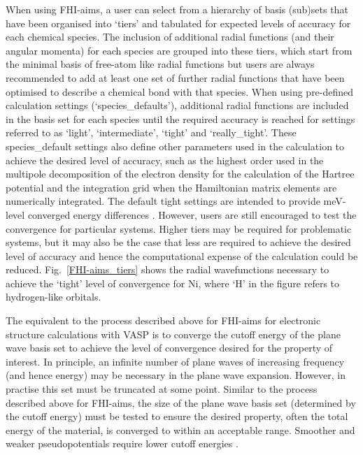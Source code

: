 \documentclass[11pt, twoside]{report}
\begin{document}
When using FHI-aims, a user can select from a hierarchy of basis (sub)sets that have been organised into `tiers' and tabulated for expected levels of accuracy for each chemical species. The inclusion of additional radial functions (and their angular momenta) for each species are grouped into these tiers, which start from the minimal basis of free-atom like radial functions but users are always recommended to add at least one set of further radial functions that have been optimised to describe a chemical bond with that species.  When using pre-defined calculation settings (`species\_defaults'), additional radial functions are included in the basis set for each species until the required accuracy is reached for settings referred to as `light', `intermediate', `tight' and `really\_tight'. These species\_default settings also define other parameters used in the calculation to achieve the desired level of accuracy, such as the highest order used in the multipole decomposition of the electron density for the calculation of the Hartree potential and the integration grid when the Hamiltonian matrix elements are numerically integrated. The default tight settings are intended to provide meV-level converged energy differences \cite{FHI-aims_manual}. However, users are still encouraged to test the convergence for particular systems. Higher tiers may be required for problematic systems, but it may also be the case that less are required to achieve the desired level of accuracy and hence the computational expense of the calculation could be reduced. Fig.~\ref{FHI-aims_tiers} shows the radial wavefunctions necessary to achieve the `tight' level of convergence for Ni, where `H' in the figure refers to hydrogen-like orbitals. 

The equivalent to the process described above for FHI-aims for electronic structure calculations with VASP is to converge the cutoff energy of the plane wave basis set to achieve the level of convergence desired for the property of interest. In principle, an infinite number of plane waves of increasing frequency (and hence energy) may be necessary in the plane wave expansion. However, in practise this set must be truncated at some point. Similar to the process described above for FHI-aims, the size of the plane wave basis set (determined by the cutoff energy) must be tested to ensure the desired property, often the total energy of the material, is converged to within an acceptable range. Smoother and weaker pseudopotentials require lower cutoff energies \cite{Prasad_ch6}.
\end{document}
